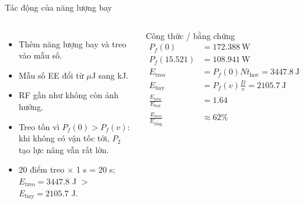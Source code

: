 \documentclass[t,aspectratio=169]{beamer}
\begin{document}
\begin{frame}{Tác động của năng lượng bay}
  \begin{columns}[T]
  \small
  \begin{itemize}\setlength{\itemsep}{4pt}
    \item Thêm năng lượng bay và treo vào mẫu số.
    \item Mẫu số EE đổi từ $\mu$J sang kJ.
    \item RF gần như không còn ảnh hưởng.
    \item Treo tốn vì \(P_f(0)>P_f(v)\): khi không có vận tốc tới, \(P_2\) tạo lực nâng vẫn rất lớn.
    \item 20 điểm treo $\times$ 1 s = 20 s; \(E_{\text{treo}}=3447.8\) J $>$ \(E_{\text{bay}}=2105.7\) J.
  \end{itemize}
  \begin{block}{Công thức / bằng chứng}\scriptsize
  \begin{align*}
  P_f(0)&=172.388\ \text{W}\\
  P_f(15.521)&=108.941\ \text{W}\\
  E_{\text{treo}}&=P_f(0)Nt_{\text{hov}}=3447.8\ \text{J}\\
  E_{\text{bay}}&=P_f(v)\frac{D}{v}=2105.7\ \text{J}\\
  \frac{E_{\text{treo}}}{E_{\text{bay}}}&=1.64\\
  \frac{E_{\text{treo}}}{E_{\text{tổng}}}&\approx62\%
  \end{align*}
  \end{block}
  \end{columns}
\end{frame}
\end{document}
